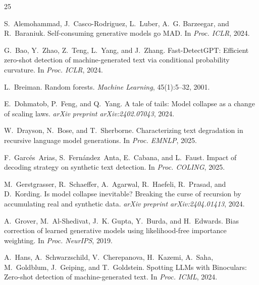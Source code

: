 \documentclass[11pt,a4paper]{article}
\begin{document}
\begin{thebibliography}{25}

S.~Alemohammad, J.~Casco-Rodriguez, L.~Luber, A.~G. Barzeegar, and R.~Baraniuk.
\newblock Self-consuming generative models go {MAD}.
\newblock In \emph{Proc. ICLR}, 2024.

G.~Bao, Y.~Zhao, Z.~Teng, L.~Yang, and J.~Zhang.
\newblock Fast-{DetectGPT}: Efficient zero-shot detection of machine-generated text via conditional probability curvature.
\newblock In \emph{Proc. ICLR}, 2024.

L.~Breiman.
\newblock Random forests.
\newblock \emph{Machine Learning}, 45(1):5--32, 2001.

E.~Dohmatob, P.~Feng, and Q.~Yang.
\newblock A tale of tails: Model collapse as a change of scaling laws.
\newblock \emph{arXiv preprint arXiv:2402.07043}, 2024.

W.~Drayson, N.~Bose, and T.~Sherborne.
\newblock Characterizing text degradation in recursive language model generations.
\newblock In \emph{Proc. EMNLP}, 2025.

F.~Garc\'es~Arias, S.~Fern\'andez~Anta, E.~Cabana, and L.~Faust.
\newblock Impact of decoding strategy on synthetic text detection.
\newblock In \emph{Proc. COLING}, 2025.

M.~Gerstgrasser, R.~Schaeffer, A.~Agarwal, R.~Haefeli, R.~Prasad, and D.~Kording.
\newblock Is model collapse inevitable? {B}reaking the curse of recursion by accumulating real and synthetic data.
\newblock \emph{arXiv preprint arXiv:2404.01413}, 2024.

A.~Grover, M.~Al-Shedivat, J.~K. Gupta, Y.~Burda, and H.~Edwards.
\newblock Bias correction of learned generative models using likelihood-free importance weighting.
\newblock In \emph{Proc. NeurIPS}, 2019.

A.~Hans, A.~Schwarzschild, V.~Cherepanova, H.~Kazemi, A.~Saha, M.~Goldblum, J.~Geiping, and T.~Goldstein.
\newblock Spotting {LLMs} with {Binoculars}: Zero-shot detection of machine-generated text.
\newblock In \emph{Proc. ICML}, 2024.


\end{thebibliography}
\end{document}

